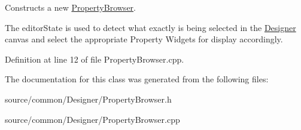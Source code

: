 Constructs a new \hyperlink{class_property_browser}{Property\-Browser}. 

The editor\-State is used to detect what exactly is being selected in the \hyperlink{class_designer}{Designer} canvas and select the appropriate Property Widgets for display accordingly. 

Definition at line 12 of file Property\-Browser.\-cpp.



The documentation for this class was generated from the following files\-:\begin{DoxyCompactItemize}
\item 
source/common/\-Designer/Property\-Browser.\-h\item 
source/common/\-Designer/Property\-Browser.\-cpp\end{DoxyCompactItemize}
